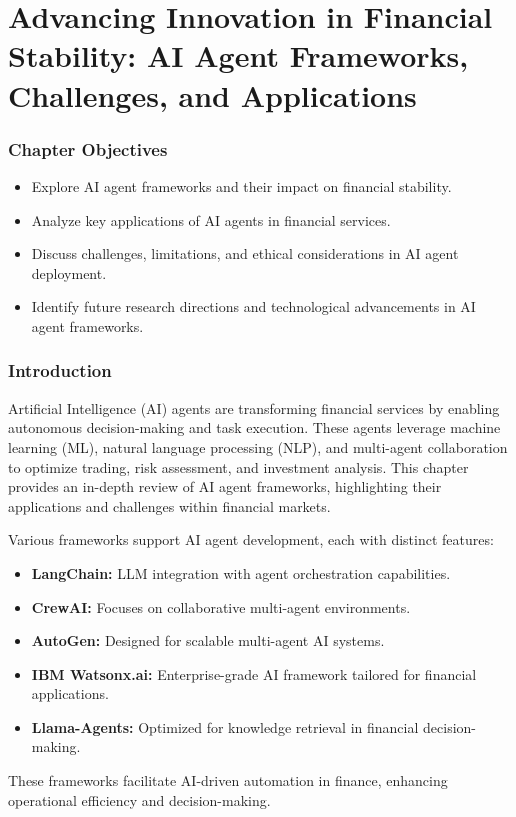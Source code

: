 \documentclass[a4paper,headinclude=on,footinclude=on,12pt,oneside]{scrbook}
\begin{document}
\chapter{Advancing Innovation in Financial Stability: AI Agent Frameworks, Challenges, and Applications}

\subsection*{Chapter Objectives}
\begin{itemize}
	\item Explore AI agent frameworks and their impact on financial stability.
	\item Analyze key applications of AI agents in financial services.
	\item Discuss challenges, limitations, and ethical considerations in AI agent deployment.
	\item Identify future research directions and technological advancements in AI agent frameworks.
\end{itemize}

\subsection*{Introduction}
Artificial Intelligence (AI) agents are transforming financial services by enabling autonomous decision-making and task execution. These agents leverage machine learning (ML), natural language processing (NLP), and multi-agent collaboration to optimize trading, risk assessment, and investment analysis. This chapter provides an in-depth review of AI agent frameworks, highlighting their applications and challenges within financial markets.

Various frameworks support AI agent development, each with distinct features:
\begin{itemize}
	\item \textbf{LangChain:} LLM integration with agent orchestration capabilities.
	\item \textbf{CrewAI:} Focuses on collaborative multi-agent environments.
	\item \textbf{AutoGen:} Designed for scalable multi-agent AI systems.
	\item \textbf{IBM Watsonx.ai:} Enterprise-grade AI framework tailored for financial applications.
	\item \textbf{Llama-Agents:} Optimized for knowledge retrieval in financial decision-making.
\end{itemize}
These frameworks facilitate AI-driven automation in finance, enhancing operational efficiency and decision-making.
\end{document}
